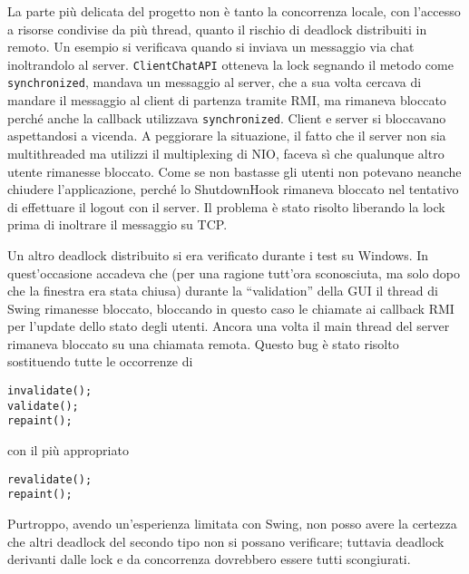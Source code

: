 \documentclass[a4paper,11pt] {article}
\begin{document}
La parte più delicata del progetto non è tanto la concorrenza locale, con l'accesso a risorse condivise da più thread, quanto il rischio di deadlock distribuiti in remoto. Un esempio si verificava quando si inviava un messaggio via chat inoltrandolo al server. \texttt{ClientChatAPI} otteneva la lock segnando il metodo come \texttt{synchronized}, mandava un messaggio al server, che a sua volta cercava di mandare il messaggio al client di partenza tramite RMI, ma rimaneva bloccato perché anche la callback utilizzava \texttt{synchronized}. Client e server si bloccavano aspettandosi a vicenda. A peggiorare la situazione, il fatto che il server non sia multithreaded ma utilizzi il multiplexing di NIO, faceva sì che qualunque altro utente rimanesse bloccato. Come se non bastasse gli utenti non potevano neanche chiudere l'applicazione, perché lo ShutdownHook rimaneva bloccato nel tentativo di effettuare il logout con il server. Il problema è stato risolto liberando la lock prima di inoltrare il messaggio su TCP.

Un altro deadlock distribuito si era verificato durante i test su Windows. In quest'occasione accadeva che (per una ragione tutt'ora sconosciuta, ma solo dopo che la finestra era stata chiusa) durante la ``validation'' della GUI il thread di Swing rimanesse bloccato, bloccando in questo caso le chiamate ai callback RMI per l'update dello stato degli utenti. Ancora una volta il main thread del server rimaneva bloccato su una chiamata remota. Questo bug è stato risolto sostituendo tutte le occorrenze di

\begin{verbatim}
invalidate();
validate();
repaint();
\end{verbatim}

con il più appropriato

\begin{verbatim}
revalidate();
repaint();
\end{verbatim}

Purtroppo, avendo un'esperienza limitata con Swing, non posso avere la certezza che altri deadlock del secondo tipo non si possano verificare; tuttavia deadlock derivanti dalle lock e da concorrenza dovrebbero essere tutti scongiurati.
\end{document}
